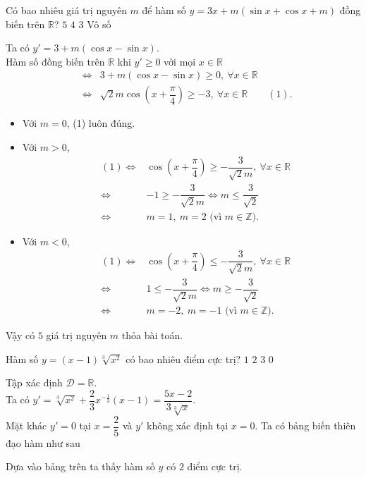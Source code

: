 \begin{ex}%
	Có bao nhiêu giá trị nguyên $m$ để hàm số $y=3x+m(\sin x+\cos x+m)$ đồng biến trên $\mathbb{R}$?
	\choice
	{\True $5$}
	{$4$}
	{$3$}
	{Vô số}
	\loigiai
	{
		Ta có $y'=3+m(\cos x-\sin x)$.\\
		Hàm số đồng biến trên $\mathbb{R}$ khi $y'\ge0$ với mọi $x\in\mathbb{R}$
		\begin{eqnarray*}
			& \Leftrightarrow &3+m(\cos x-\sin x)\ge0,~\forall x\in\mathbb{R}\\
			& \Leftrightarrow &\sqrt{2}m\cos\left(x+\dfrac{\pi}{4}\right)\ge-3,~\forall x\in\mathbb{R}\qquad(1).
		\end{eqnarray*}
		\begin{itemize}
			\item Với $m=0$, (1) luôn đúng.
			\item Với $m>0$,
			\begin{eqnarray*}
					&(1) \Leftrightarrow &\cos\left(x+\dfrac{\pi}{4}\right)\ge-\dfrac{3}{\sqrt{2}m},~\forall x\in\mathbb{R} \\
					& \Leftrightarrow &-1\ge-\dfrac{3}{\sqrt{2}m}\Leftrightarrow m\le\dfrac{3}{\sqrt{2}}\\
					& \Leftrightarrow &m=1,~m=2 \text{ (vì $m \in \mathbb{Z}$).}
			\end{eqnarray*}
			\item Với $m<0$,
			\begin{eqnarray*}
				&(1) \Leftrightarrow &\cos\left(x+\dfrac{\pi}{4}\right)\le-\dfrac{3}{\sqrt{2}m},~\forall x\in\mathbb{R} \\
				& \Leftrightarrow &1\le-\dfrac{3}{\sqrt{2}m}\Leftrightarrow m\ge-\dfrac{3}{\sqrt{2}}\\
				& \Leftrightarrow &m=-2,~m=-1 \text{ (vì $m \in \mathbb{Z}$).}
			\end{eqnarray*}
		\end{itemize}\vspace{-3ex}
	Vậy có $5$ giá trị nguyên $m$ thỏa bài toán.
	}
\end{ex}

\begin{ex}%
	Hàm số $y=(x-1)\sqrt[3]{x^2}$ có bao nhiêu điểm cực trị?
	\choice
	{$1$}
	{\True $2$}
	{$3$}
	{$0$}
	\loigiai
	{
		Tập xác định $\mathscr{D}=\mathbb{R}$.\\
		Ta có $y'=\sqrt[3]{x^2}+\dfrac{2}{3}x^{-\frac{1}{3}}(x-1)=\dfrac{5x-2}{3\sqrt[3]{x}}$.\\
		Mặt khác $y'=0$ tại $x=\dfrac{2}{5}$ và $y'$ không xác định tại $x=0$. Ta có bảng biến thiên đạo hàm như sau
		\begin{center}
		\end{center}
	Dựa vào bảng trên ta thấy hàm số $y$ có $2$ điểm cực trị.
	}
\end{ex}


